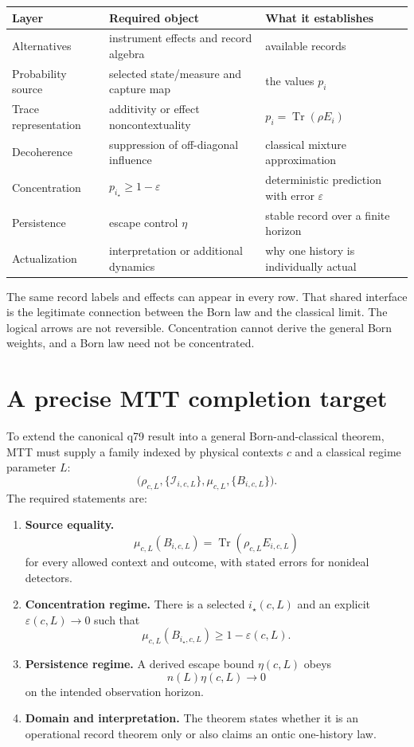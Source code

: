 \documentclass[11pt]{article}
\newcommand{\Tr}{\operatorname{Tr}}
\begin{document}
\begin{center}
\begin{tabular}{p{}p{}p{}}
\toprule
Layer & Required object & What it establishes\\
\midrule
Alternatives
& instrument effects and record algebra
& available records\\
Probability source
& selected state/measure and capture map
& the values \(p_i\)\\
Trace representation
& additivity or effect noncontextuality
& \(p_i=\Tr(\rho E_i)\)\\
Decoherence
& suppression of off-diagonal influence
& classical mixture approximation\\
Concentration
& \(p_{i_\star}\geq1-\varepsilon\)
& deterministic prediction with error \(\varepsilon\)\\
Persistence
& escape control \(\eta\)
& stable record over a finite horizon\\
Actualization
& interpretation or additional dynamics
& why one history is individually actual\\
\bottomrule
\end{tabular}
\end{center}

The same record labels and effects can appear in every row. That shared
interface is the legitimate connection between the Born law and the classical
limit. The logical arrows are not reversible. Concentration cannot derive the
general Born weights, and a Born law need not be concentrated.

\section{A precise MTT completion target}

To extend the canonical q79 result into a general Born-and-classical theorem,
MTT must supply a family indexed by physical contexts \(c\) and a classical
regime parameter \(L\):
\[
\bigl(
\rho_{c,L},
\{\mathcal{I}_{i,c,L}\},
\mu_{c,L},
\{B_{i,c,L}\}
\bigr).
\]
The required statements are:

\begin{enumerate}
\item \textbf{Source equality.}
\[
\mu_{c,L}(B_{i,c,L})
=\Tr(\rho_{c,L}E_{i,c,L})
\]
for every allowed context and outcome, with stated errors for nonideal
detectors.
\item \textbf{Concentration regime.} There is a selected
\(i_\star(c,L)\) and an explicit \(\varepsilon(c,L)\to0\) such that
\[
\mu_{c,L}(B_{i_\star,c,L})\geq1-\varepsilon(c,L).
\]
\item \textbf{Persistence regime.} A derived escape bound
\(\eta(c,L)\) obeys
\[
n(L)\eta(c,L)\to0
\]
on the intended observation horizon.
\item \textbf{Domain and interpretation.} The theorem states whether it is an
operational record theorem only or also claims an ontic one-history law.
\end{enumerate}
\end{document}
